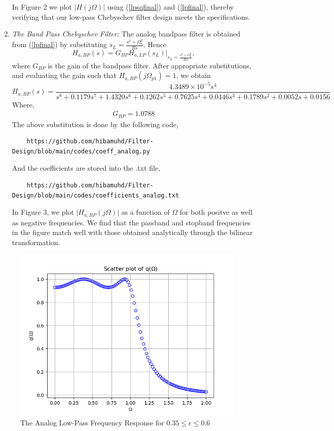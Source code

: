 \documentclass{article}
\begin{document}
\begin{enumerate}
In Figure 2 we plot $|H(j\Omega)|$ using (\ref{lpsqfinal}) and (\ref{lpfinal}), thereby verifying that our low-pass Chebyschev filter design meets the specifications.
\item {\em The Band Pass Chebyschev Filter:}  The analog bandpass filter is obtained from (\ref{lpfinal}) by substituting
$s_L = \frac{s^2 + \Omega_0^2}{Bs}$.  Hence
\begin{equation}
H_{a,BP}(s) = G_{BP}H_{a,LP}(s_L)\vert_{s_L = \frac{s^2 + \Omega_0^2}{Bs}},
\end{equation}
where $G_{BP}$ is the gain of the bandpass filter.  After appropriate substitutions, and evaluating the gain 
such that $H_{a,BP}(j\Omega_{p1}) = 1$, we obtain
{
\tiny
\begin{equation}
\label{bpfinal}
H_{a,BP}(s) = \frac{4.3489\times 10^{-5}s^4}{s^8+0.1179s^7+1.4320s^6+0.1262s^5+0.7625s^4+0.0446s^3+0.1789s^2+0.0052s+0.0156}
\end{equation}
}
Where,
\begin{align}
    G_{BP} = 1.0788
\end{align}
The above substitution is done by the following code,
\begin{lstlisting}
    https://github.com/hibamuhd/Filter-Design/blob/main/codes/coeff_analog.py
\end{lstlisting}
And the coefficients are stored into the .txt file,
\begin{lstlisting}
    https://github.com/hibamuhd/Filter-Design/blob/main/codes/coefficients_analog.txt
\end{lstlisting}
In Figure 3, we plot $\vert H_{a,BP}(j\Omega)\vert$ as a function of $\Omega$ for both positve as
well as negative frequencies.  We find that the passband and stopband frequencies in the figure
match well with those obtained analytically through the bilinear transformation.
\end{enumerate}
\begin{figure}
\label{fig1}
\includegraphics[width = 15cm]{figs/figure1.png}
\caption{The Analog Low-Pass Frequency Response for $0.35 \leq \epsilon \leq 0.6$}
\end{figure}
\end{document}
